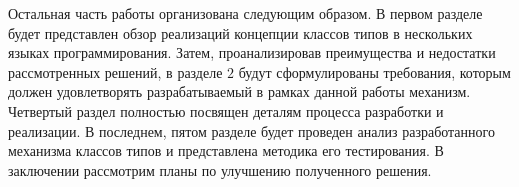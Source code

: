 Остальная часть работы организована следующим образом. В первом разделе будет представлен обзор реализаций концепции классов типов в нескольких языках программирования. Затем, проанализировав преимущества и недостатки рассмотренных решений, в разделе $2$ будут сформулированы требования, которым должен удовлетворять разрабатываемый в рамках данной работы механизм. Четвертый раздел полностью посвящен деталям процесса разработки и реализации. В последнем, пятом разделе будет проведен анализ разработанного механизма классов типов и представлена методика его тестирования. В заключении рассмотрим планы по улучшению полученного решения.        